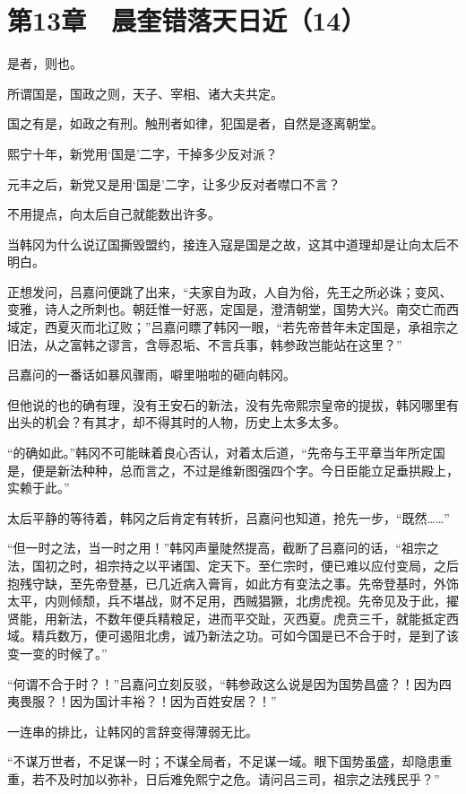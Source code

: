 \section{第13章　晨奎错落天日近（14）}

是者，则也。

所谓国是，国政之则，天子、宰相、诸大夫共定。

国之有是，如政之有刑。触刑者如律，犯国是者，自然是逐离朝堂。

熙宁十年，新党用‘国是’二字，干掉多少反对派？

元丰之后，新党又是用‘国是’二字，让多少反对者噤口不言？

不用提点，向太后自己就能数出许多。

当韩冈为什么说辽国撕毁盟约，接连入寇是国是之故，这其中道理却是让向太后不明白。

正想发问，吕嘉问便跳了出来，“夫家自为政，人自为俗，先王之所必诛；变风、变雅，诗人之所刺也。朝廷惟一好恶，定国是，澄清朝堂，国势大兴。南交亡而西域定，西夏灭而北辽败；”吕嘉问瞟了韩冈一眼，“若先帝昔年未定国是，承祖宗之旧法，从之富韩之谬言，含辱忍垢、不言兵事，韩参政岂能站在这里？”

吕嘉问的一番话如暴风骤雨，噼里啪啦的砸向韩冈。

但他说的也的确有理，没有王安石的新法，没有先帝熙宗皇帝的提拔，韩冈哪里有出头的机会？有其才，却不得其时的人物，历史上太多太多。

“的确如此。”韩冈不可能昧着良心否认，对着太后道，“先帝与王平章当年所定国是，便是新法种种，总而言之，不过是维新图强四个字。今日臣能立足垂拱殿上，实赖于此。”

太后平静的等待着，韩冈之后肯定有转折，吕嘉问也知道，抢先一步，“既然……”

“但一时之法，当一时之用！”韩冈声量陡然提高，截断了吕嘉问的话，“祖宗之法，国初之时，祖宗持之以平诸国、定天下。至仁宗时，便已难以应付变局，之后抱残守缺，至先帝登基，已几近病入膏肓，如此方有变法之事。先帝登基时，外饰太平，内则倾颓，兵不堪战，财不足用，西贼猖獗，北虏虎视。先帝见及于此，擢贤能，用新法，不数年便兵精粮足，进而平交趾，灭西夏。虎贲三千，就能抵定西域。精兵数万，便可遏阻北虏，诚乃新法之功。可如今国是已不合于时，是到了该变一变的时候了。”

“何谓不合于时？！”吕嘉问立刻反驳，“韩参政这么说是因为国势昌盛？！因为四夷畏服？！因为国计丰裕？！因为百姓安居？！”

一连串的排比，让韩冈的言辞变得薄弱无比。

“不谋万世者，不足谋一时；不谋全局者，不足谋一域。眼下国势虽盛，却隐患重重，若不及时加以弥补，日后难免熙宁之危。请问吕三司，祖宗之法残民乎？”


